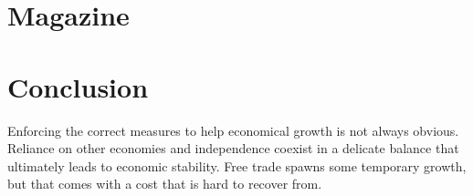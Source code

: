 \documentclass [11pt]{article}
\begin{document}
\lipsum[1-2]

\section{Magazine}

\lipsum[3-4]

\section*{Conclusion}
Enforcing the correct measures to help economical growth is not always obvious. Reliance on other economies and independence coexist in a delicate balance that ultimately leads to economic stability. 
Free trade spawns some temporary growth, but that comes with a cost that is hard to recover from.
\printbibliography
\end{document}
